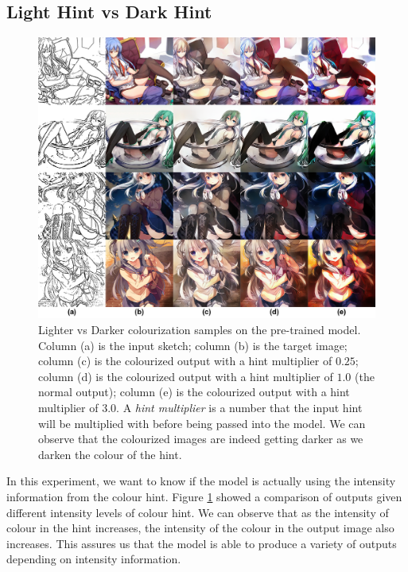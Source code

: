 \subsection{Light Hint vs Dark Hint}
\begin{figure}
    \centering
    \includegraphics[width=1.0\textwidth]{images/colorization/lighter_vs_darker.png}
    \caption[Lighter vs Darker colourization samples on the pre-trained model.]{Lighter vs Darker colourization samples on the pre-trained model. Column (a) is the input sketch; column (b) is the target image; column (c) is the colourized output with a hint multiplier of $0.25$; column (d) is the colourized output with a hint multiplier of $1.0$ (the normal output); column (e) is the colourized output with a hint multiplier of $3.0$. A \textit{hint multiplier} is a number that the input hint will be multiplied with before being passed into the model. We can observe that the colourized images are indeed getting darker as we darken the colour of the hint.}
    \label{fig:lighter_vs_darker}
\end{figure}
In this experiment, we want to know if the model is actually using the intensity information from the colour hint. Figure \ref{fig:lighter_vs_darker} showed a comparison of outputs given different intensity levels of colour hint. We can observe that as the intensity of colour in the hint increases, the intensity of the colour in the output image also increases. This assures us that the model is able to produce a variety of outputs depending on intensity information.

